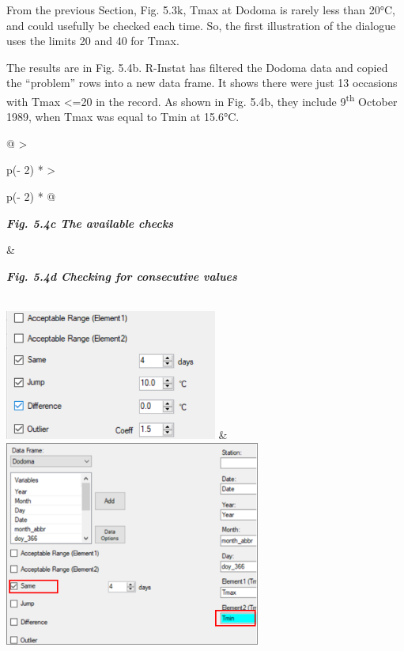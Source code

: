 \documentclass[
  letterpaper,
  DIV=11,
  numbers=noendperiod]{scrreprt}
\begin{document}
From the previous Section, Fig. 5.3k, Tmax at Dodoma is rarely less than
20°C, and could usefully be checked each time. So, the first
illustration of the dialogue uses the limits 20 and 40 for Tmax.

The results are in Fig. 5.4b. R-Instat has filtered the Dodoma data and
copied the ``problem'' rows into a new data frame. It shows there were
just 13 occasions with Tmax \textless=20 in the record. As shown in Fig.
5.4b, they include 9\textsuperscript{th} October 1989, when Tmax was
equal to Tmin at 15.6°C.

\begin{longtable}[]{@{}
  >{\raggedright\arraybackslash}p{(\columnwidth - 2\tabcolsep) * }
  >{\raggedright\arraybackslash}p{(\columnwidth - 2\tabcolsep) * }@{}}
\toprule\noalign{}
\begin{minipage}[b]{\linewidth}\raggedright
\textbf{\emph{Fig. 5.4c The available checks}}
\end{minipage} & \begin{minipage}[b]{\linewidth}\raggedright
\textbf{\emph{Fig. 5.4d Checking for consecutive values}}
\end{minipage} \\
\midrule\noalign{}
\endhead
\bottomrule\noalign{}
\endlastfoot
\includegraphics[width=2.74962in,height=1.68545in]{figures/Fig5.4c.png}
&
\includegraphics[width=3.31667in,height=2.67081in]{figures/Fig5.4d.png} \\
\end{longtable}
\end{document}
